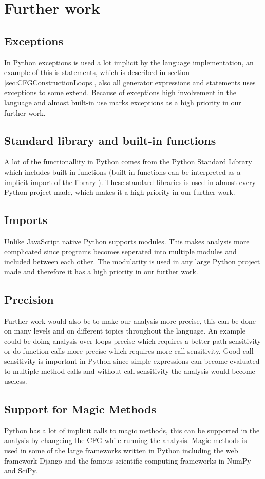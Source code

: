 \chapter{Further work}

\section{Exceptions}
In Python exceptions is used a lot implicit by the language implementation, an example of this is  statements, which is described in section \ref{sec:CFGConstructionLoops}, also all generator expressions and  statements uses exceptions to some extend. Because of exceptions high involvement in the language and almost built-in use marks exceptions as a high priority in our further work.

\section{Standard library and built-in functions}
A lot of the functionallity in Python comes from the Python Standard Library which includes built-in functions (built-in functions can be interpreted as a implicit import of the library ). These standard libraries is used in almost every Python project made, which makes it a high priority in our further work.

\section{Imports}
Unlike JavaScript native Python supports modules. This makes analysis more complicated since programs becomes seperated into multiple modules and included between each other. The modularity is used in any large Python project made and therefore it has a high priority in our further work.

\section{Precision}
Further work would also be to make our analysis more precise, this can be done on many levels and on different topics throughout the language. An example could be doing analysis over loops precise which requires a better path sensitivity or do function calls more precise which requires more call sensitivity. Good call sensitivity is important in Python since simple expressions can become evaluated to multiple method calls and without call sensitivity the analysis would become useless. 

\section{Support for Magic Methods}
Python has a lot of implicit calls to magic methods, this can be supported in the analysis by changeing the CFG while running the analysis. Magic methods is used in some of the large frameworks written in Python including the web framework Django and the famous scientific computing frameworks in NumPy and SciPy.
